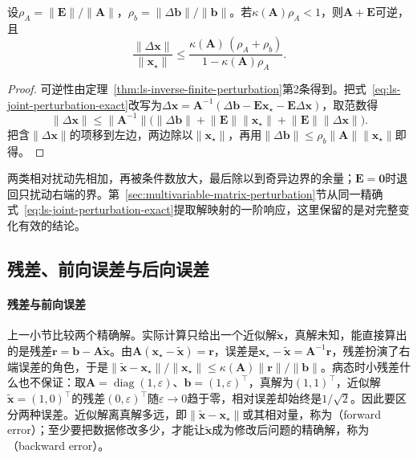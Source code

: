\begin{theorem}[矩阵与右端同时扰动时的解误差]
\label{thm:ls-linear-system-perturbation}
设$\rho_A=\lVert\bm E\rVert/\lVert\bm A\rVert$，$\rho_b=\lVert\Delta\bm b\rVert/\lVert\bm b\rVert$。若$\kappa(\bm A)\rho_A<1$，则$\bm A+\bm E$可逆，且
\begin{equation}
 \frac{\lVert\Delta\bm x\rVert}{\lVert\bm x_\star\rVert}
 \leq\frac{\kappa(\bm A)\,(\rho_A+\rho_b)}{1-\kappa(\bm A)\rho_A}.
 \label{eq:matrix-analysis-linear-system-perturbation}
\end{equation}
\end{theorem}
\begin{proof}
可逆性由定理~\ref{thm:ls-inverse-finite-perturbation}第2条得到。把式~\eqref{eq:ls-joint-perturbation-exact}改写为$\Delta\bm x=\bm A^{-1}(\Delta\bm b-\bm E\bm x_\star-\bm E\Delta\bm x)$，取范数得
\[
 \lVert\Delta\bm x\rVert\leq\lVert\bm A^{-1}\rVert\bigl(\lVert\Delta\bm b\rVert+\lVert\bm E\rVert\lVert\bm x_\star\rVert+\lVert\bm E\rVert\lVert\Delta\bm x\rVert\bigr).
\]
把含$\lVert\Delta\bm x\rVert$的项移到左边，两边除以$\lVert\bm x_\star\rVert$，再用$\lVert\Delta\bm b\rVert\leq\rho_b\lVert\bm A\rVert\lVert\bm x_\star\rVert$即得。
\end{proof}

两类相对扰动先相加，再被条件数放大，最后除以到奇异边界的余量；$\bm E=\bm0$时退回只扰动右端的界。第~\ref{sec:multivariable-matrix-perturbation}节从同一精确式~\eqref{eq:ls-joint-perturbation-exact}提取解映射的一阶响应，这里保留的是对完整变化有效的结论。

\subsection{残差、前向误差与后向误差}
\label{sec:ls-numerical-stability}

\paragraph{残差与前向误差}
上一小节比较两个精确解。实际计算只给出一个近似解$\tilde{\bm x}$，真解未知，能直接算出的是残差$\bm r=\bm b-\bm A\tilde{\bm x}$。由$\bm A(\bm x_\star-\tilde{\bm x})=\bm r$，误差是$\bm x_\star-\tilde{\bm x}=\bm A^{-1}\bm r$，残差扮演了右端误差的角色，于是$\lVert\tilde{\bm x}-\bm x_\star\rVert/\lVert\bm x_\star\rVert\leq\kappa(\bm A)\lVert\bm r\rVert/\lVert\bm b\rVert$。病态时小残差什么也不保证：取$\bm A=\operatorname{diag}(1,\varepsilon)$、$\bm b=(1,\varepsilon)^\top$，真解为$(1,1)^\top$，近似解$\tilde{\bm x}=(1,0)^\top$的残差$(0,\varepsilon)^\top$随$\varepsilon\to0$趋于零，相对误差却始终是$1/\sqrt2$。因此要区分两种误差。近似解离真解多远，即$\lVert\tilde{\bm x}-\bm x_\star\rVert$或其相对量，称为（forward error）；至少要把数据修改多少，才能让$\tilde{\bm x}$成为修改后问题的精确解，称为（backward error）。

